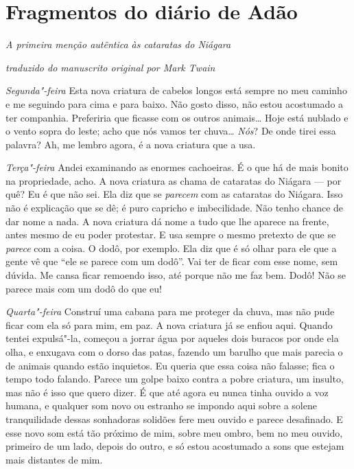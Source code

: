 \chapter[Fragmentos do diário de Adão]{Fragmentos do diário de Adão}



\textit{A primeira menção autêntica às cataratas do Niágara}


\begin{flushright}
\itshape{traduzido do manuscrito original por Mark Twain}
\end{flushright}



\textit{Segunda"-feira}  
Esta nova criatura de cabelos longos está sempre no meu caminho e
me seguindo para cima e para baixo. Não gosto disso, não estou acostumado
a ter companhia. Preferiria que ficasse com os outros animais\ldots{}
Hoje está nublado e o vento sopra do leste; acho que nós vamos ter chuva\ldots{}
\textit{Nós}? De onde tirei essa palavra? Ah, me lembro agora, é a nova criatura que a usa.

\textit{Terça"-feira}  Andei examinando as enormes cachoeiras. É o que há de mais bonito
na propriedade, acho. A nova criatura as chama de cataratas do Niágara --- por
quê? Eu é que não sei. Ela diz que se \textit{parecem} com as cataratas do Niágara.
Isso não é explicação que se dê; é puro capricho e imbecilidade. Não tenho 
chance de dar nome a nada. A nova criatura dá nome a tudo que lhe aparece na
frente, antes mesmo de eu poder protestar. E usa sempre o mesmo pretexto de que se
\textit{parece} com a coisa. O dodô, por exemplo. Ela diz que é só olhar para ele
que a gente vê que “ele se parece com um dodô”. Vai ter de ficar com esse
nome, sem dúvida. Me cansa ficar remoendo isso, até porque não me faz bem.
Dodô! Não se parece mais com um dodô do que eu!

\textit{Quarta"-feira}    Construí uma cabana para me proteger da chuva, mas não pude ficar
com ela só para mim, em paz. A nova criatura já se enfiou aqui. Quando tentei
expulsá"-la, começou a jorrar água por aqueles dois buracos por onde ela
olha, e enxugava com o dorso das patas, fazendo um barulho que mais parecia o de
animais quando estão inquietos. Eu queria que essa coisa não falasse; fica o
tempo todo falando. Parece um golpe baixo contra a pobre criatura, um
insulto, mas não é isso que quero dizer. É que até agora eu nunca tinha ouvido
a voz humana, e qualquer som novo ou estranho se impondo aqui sobre a solene
tranquilidade dessas sonhadoras solidões fere meu ouvido e parece desafinado. E
esse novo som está tão próximo de mim, sobre meu ombro, bem no meu ouvido,
primeiro de um lado, depois do outro, e só estou acostumado a sons que estejam
mais distantes de mim.

